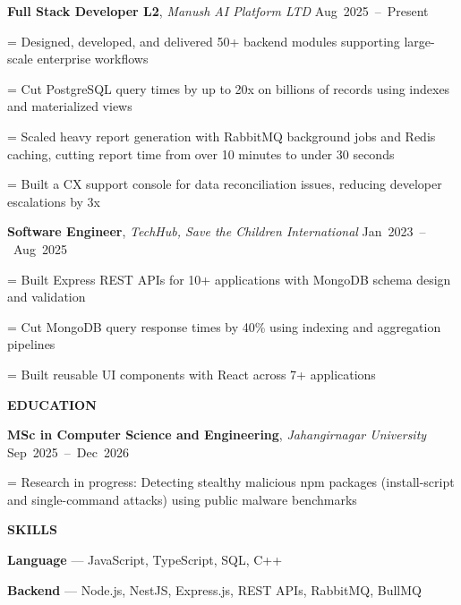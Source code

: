 \documentclass[a4paper]{article}
\newcommand{\sectionfont}{%
  \fontsize{11pt}{13pt}\selectfont\bfseries
}
\newlength{\listindent}
\newcommand{\sectiontitle}[1]{%
  \par
  \vspace{8pt}
  {\sectionfont #1}\par
  \vspace{3pt}
}
\newlength{\bulletgap}
\newcommand{\resumebullet}[1]{%
  \begingroup
  \leftskip=\listindent
  \parindent=0pt
  \noindent
  \llap{%
    \raisebox{0.15ex}{%
      \fontsize{7}{7}\selectfont -
    }%
    \hspace{6pt}%
  }%
  #1\par
  \endgroup
  \vspace{\bulletgap}%
}
\newcommand{\experienceheader}[3]{%
  \noindent
  \textbf{#1}, \textit{#2}%
  \hfill
  \mbox{#3}%
  \par
  \vspace{1pt}
}
\newcommand{\skill}[2]{%
  \textbf{#1} --- #2\par
  \vspace{1pt}%
}
\begin{document}
\experienceheader
{Full Stack Developer L2}
{Manush AI Platform LTD}
{Aug 2025 -- Present}

\resumebullet{Designed, developed, and delivered 50+ backend modules supporting large-scale enterprise workflows}

\resumebullet{Cut PostgreSQL query times by up to 20x on billions of records using indexes and materialized views}

\resumebullet{Scaled heavy report generation with RabbitMQ background jobs and Redis caching, cutting report time from over 10 minutes to under 30 seconds}

\resumebullet{Built a CX support console for data reconciliation issues, reducing developer escalations by 3x}

\vspace{6pt}

\experienceheader
{Software Engineer}
{TechHub, Save the Children International}
{Jan 2023 -- Aug 2025}



\resumebullet{Built Express REST APIs for 10+ applications with MongoDB schema design and validation}

\resumebullet{Cut MongoDB query response times by 40\% using indexing and aggregation pipelines}

\resumebullet{Built reusable UI components with React across 7+ applications}


\sectiontitle{EDUCATION}

\textbf{MSc in Computer Science and Engineering},
\textit{Jahangirnagar University}%
\hfill
\mbox{Sep 2025 -- Dec 2026}\par

\vspace{1pt}

\resumebullet{Research in progress: Detecting stealthy malicious npm packages (install-script and single-command attacks) using public malware benchmarks}


\sectiontitle{SKILLS}

\skill{Language}{JavaScript, TypeScript, SQL, C++}

\skill{Backend}{Node.js, NestJS, Express.js, REST APIs, RabbitMQ, BullMQ}
\end{document}

